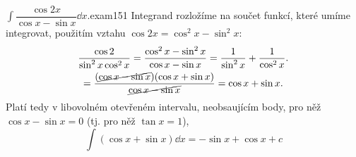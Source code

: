\begin{mathexam}{\(\int\dfrac{\cos2x}{\cos x - \sin x}\dd{x}.\)}{exam151} 
  Integrand rozložíme na součet funkcí, které umíme integrovat, použitím vztahu \(\cos2x=\cos^2x -
  \sin^2x\): 
  \begin{multline*}
    \dfrac{\cos2}{\sin^2x\cos^2x} 
      = \dfrac{\cos^2x - \sin^2x}{\cos x - \sin x} = \dfrac{1}{\sin^2x} + \dfrac{1}{\cos^2x}. \\
      = \dfrac{(\cancel{\cos x - \sin x})(\cos x + \sin x)}{\cancel{\cos x - \sin x}} 
      = \cos x + \sin x.  
  \end{multline*}
  Platí tedy v libovolném otevřeném intervalu, neobsaujícím body, pro něž \(\cos x - \sin x = 0\)
  (tj. pro něž \(\tan x = 1\)),
  \begin{equation*}
    \int(\cos x + \sin x)\dd{x} = -\sin x + \cos x + c 
  \end{equation*}
  \vspace{-4mm}
\end{mathexam}